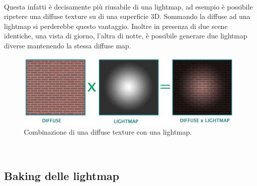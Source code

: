 \\
Questa infatti è decisamente più riusabile di una lightmap, ad esempio è possibile ripetere una diffuse texture su di una superficie 3D. Sommando la diffuse ad una lightmap si perderebbe questo vantaggio. Inoltre in presenza di due scene identiche, una vista di giorno, l’altra di notte, è possibile generare due lightmap diverse mantenendo la stessa diffuse map.
\\
\begin{figure}[htb]
 \centering
 \includegraphics[width=0.9\linewidth]{images/chapter_stato_arte/stato_arte_diffuse_lightmap.png}\hfill
 \caption[Combinazione texture/lightmap]{Combinazione di una diffuse texture con una lightmap.}
 \label{fig:stato_arte_diffuse_lightmap}
\end{figure}
\\
\subsection{Baking delle lightmap}
\label{sec:chapter_stato_arte_baking_lightmap}

